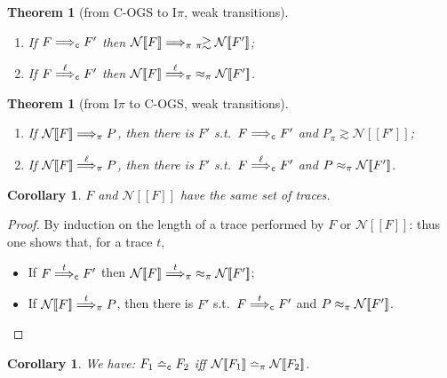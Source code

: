 \documentclass[11pt,a4paper]{amsart}
\theoremstyle{plain}
\theoremstyle{definition}
\theoremstyle{defC}
\theoremstyle{thmC}
\theoremstyle{plain}
\numberwithin{equation}{section}
\newcommand{\COGS}{\mbox{{\rm C-OGS}}\xspace}      %
\newcommand{\rmm}[1]{{\tt{\lowercase{#1}}}}
\newcommand{\genArr}[2]{\mathrel{\stackrel{{#1}}{\Longrightarrow}_{\rmm{\lowercase{#2}}}}}  %
\newcommand{\genLongrightarrow}[1]{\mathrel{\Longrightarrow_{\rmm{\lowercase{#1}}}}}
\newcommand{\ArrPI}[1]{\genArr{#1}{\pi}}   %
\newcommand{\LongrightarrowPI}{\genLongrightarrow{\pi}}
\newcommand{\ArrC}[1]{\genArr{#1}{C}}   %
\newcommand{\Longrightarrowp}{\genLongrightarrow{C}}
\newcommand{\genTE}[1]{\mathrel{\bumpeq_{\rmm{\lowercase{#1}}}}}       %
\newcommand{\genwb}[1]{\mathrel{\approx_{\rmm{\lowercase{#1}}}}}       %
\newcommand{\wbPI}{\genwb{\pi}}       %
\newcommand{\TEPI}{\genTE{\pi}}       %
\newcommand{\TEp}{\genTE{C}}       %
\newcommand{\contr}{\mathrel{\mbox{}_{\pi}\!\!\gtrsim}}
\newcommand{\FF}{F}
\newcommand{\encoN}[1]{{\mathcal {N}} [\! [ #1 ] \! ]  }
\newcommand{\encoSN}{\encoN}
\newcommand{\Intp}{\mbox{I$\pi$}\xspace}   %
\newcommand{\piI}{\Intp}   %
\theoremstyle{plain}
\newtheorem{theorem}[thm]{Theorem}
\newtheorem{corollary}[thm]{Corollary}
\theoremstyle{definition}
\begin{document}
\begin{theorem}[from \COGS to \piI, weak transitions]
\label{t:CBNpogs_short_weak}
$ $ \begin{enumerate}

\item  If $F \Longrightarrowp F'$ then 
$ \encoSN F \LongrightarrowPI \; \contr \encoSN {F'}$; 

\item  If $F \ArrC{\ell} F'$  then 
$ \encoSN F \ArrPI{\ell} \;  \wbPI  \encoSN  {F'}$.
\end{enumerate}
\end{theorem} 


\begin{theorem}[from  \piI to \COGS, weak transitions]
\label{t:CBNpogs_short_converse_weak}
$ $ \begin{enumerate}

\item  If
$ \encoSN F \LongrightarrowPI  P$, then there is $F'$ s.t.\  
 $F \Longrightarrowp F'$ and 
$P 
\contr \encoSN {F'}$;

\item  If
$ \encoSN F \ArrPI{\ell}  P$, then there is $F'$ s.t.\  
 $F \ArrC{\ell} F'$ and 
$P 
\wbPI \encoSN {F'}$.
\end{enumerate}
\end{theorem} 



\begin{corollary}
\label{c:CBNpogs_pi}
 $F$ and $ \encoSN F$ have the same set of traces. 
\end{corollary}  

\begin{proof}
By induction on the length of a trace performed by 
 $F$  or $ \encoSN F$: thus one shows that, for a trace $t$,
\begin{itemize}
\item  If $F \ArrC{t} F'$  then 
$ \encoSN F \ArrPI{t}\;  \wbPI  \encoSN  {F'}$;
\item  If
$ \encoSN F \ArrPI{t}  P$, then there is $F'$ s.t.\  
 $F \ArrC{t} F'$ and 
$P 
\wbPI \encoSN {F'}$.\qedhere
\end{itemize} 
\end{proof} 



\begin{corollary}
\label{c:CBNpogs_pi_traces}
We have: 
 $\FF_1 \TEp \FF_2$ iff 
 $ \encoSN {\FF_1} \TEPI  \encoSN {\FF_2}$.  
\end{corollary}  
\end{document}
